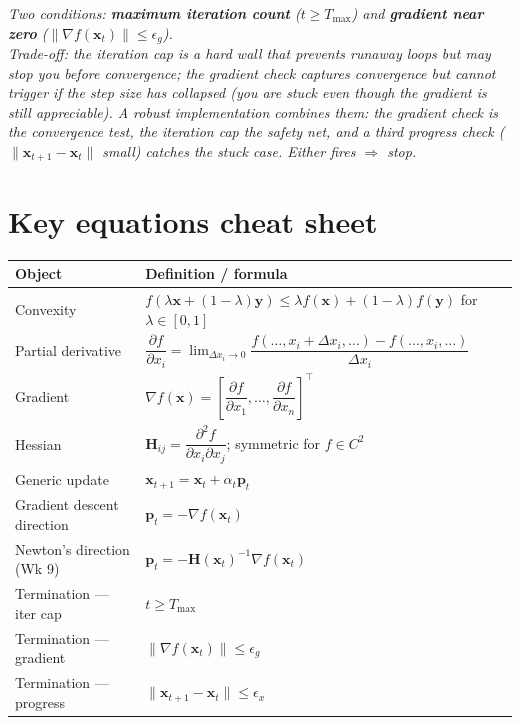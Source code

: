 \documentclass[11pt, a4paper]{article}
\newcommand{\thead}[1]{\textbf{#1}}
\begin{document}
\begin{exambox}
\textit{Two conditions: \textbf{maximum iteration count} ($t \ge T_{\max}$) and \textbf{gradient near zero} ($\|\nabla f(\mathbf{x}_t)\| \le \epsilon_g$).}\\[0.3em]
\textit{Trade-off: the iteration cap is a hard wall that prevents runaway loops but may stop you before convergence; the gradient check captures convergence but cannot trigger if the step size has collapsed (you are stuck even though the gradient is still appreciable). A robust implementation combines them: the gradient check is the convergence test, the iteration cap the safety net, and a third progress check ($\|\mathbf{x}_{t+1} - \mathbf{x}_t\|$ small) catches the stuck case. Either fires \(\Rightarrow\) stop.}
\end{exambox}

\section*{Key equations cheat sheet}

\begin{tabularx}{\linewidth}{@{}lX@{}}
\toprule
\thead{Object} & \thead{Definition / formula} \\
\midrule
Convexity & $f(\lambda\mathbf{x} + (1-\lambda)\mathbf{y}) \le \lambda f(\mathbf{x}) + (1-\lambda) f(\mathbf{y})$ for $\lambda \in [0,1]$ \\
Partial derivative & $\dfrac{\partial f}{\partial x_i} = \lim_{\Delta x_i \to 0} \dfrac{f(\ldots, x_i + \Delta x_i, \ldots) - f(\ldots, x_i, \ldots)}{\Delta x_i}$ \\[0.6em]
Gradient & $\nabla f(\mathbf{x}) = \left[\dfrac{\partial f}{\partial x_1}, \ldots, \dfrac{\partial f}{\partial x_n}\right]^\top$ \\[0.6em]
Hessian & $\mathbf{H}_{ij} = \dfrac{\partial^2 f}{\partial x_i \partial x_j}$; symmetric for $f \in C^2$ \\[0.6em]
Generic update & $\mathbf{x}_{t+1} = \mathbf{x}_t + \alpha_t \mathbf{p}_t$ \\
Gradient descent direction & $\mathbf{p}_t = -\nabla f(\mathbf{x}_t)$ \\
Newton's direction (Wk 9) & $\mathbf{p}_t = -\mathbf{H}(\mathbf{x}_t)^{-1}\nabla f(\mathbf{x}_t)$ \\
Termination — iter cap & $t \ge T_{\max}$ \\
Termination — gradient & $\|\nabla f(\mathbf{x}_t)\| \le \epsilon_g$ \\
Termination — progress & $\|\mathbf{x}_{t+1} - \mathbf{x}_t\| \le \epsilon_x$ \\
\bottomrule
\end{tabularx}
\end{document}
